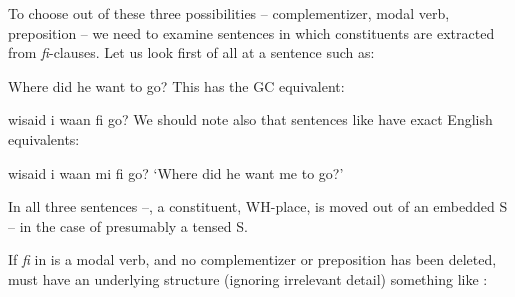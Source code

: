 To choose out of these three possibilities -- complementizer, modal verb, preposition -- we need to examine sentences in which
constituents are extracted from \textit{fi}-clauses. Let us look first of all at a sentence such as:

\ea\label{ex:2:196}
Where did he want to go? 
\z
This has the GC equivalent:

\ea\label{ex:2:197}
wisaid i waan fi go?
\z
We should note also that sentences like  have exact English equivalents:

\ea\label{ex:2:198}
wisaid i waan mi fi go?
\glt `Where did he want me to go?'
\z

In all three sentences --, a constituent, WH-place, is moved out of an embedded S -- in the case of  presumably a tensed S.

If \textit{fi} in  is a modal verb, and no complementizer or preposition has been deleted,  must have an underlying structure (ignoring irrelevant detail) something like :

